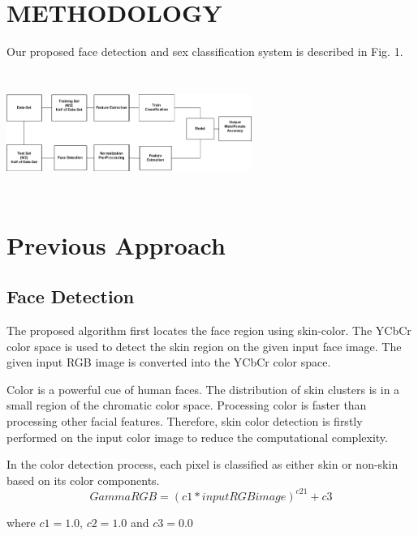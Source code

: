\documentclass[journal]{IEEEtran}
\begin{document}
	
	
	
	
	
	
	\ifCLASSOPTIONcaptionsoff
	\newpage
	\fi
	
	
	
	\section{\textbf{METHODOLOGY}}
	Our proposed face detection and sex classification system is
	described in Fig. 1.\\
	\begin{minipage}{\linewidth}
		\centering
		\includegraphics[width = 80mm,height=40mm]{Methodology.JPG}
	\end{minipage} 
	\section{\textbf{Previous Approach}}
	\subsection{\textbf{Face Detection}}
	The proposed algorithm first locates the face region
	using skin-color. The YCbCr color space is used to detect
	the skin region on the given input face image. The given
	input RGB image is converted into the YCbCr color
	space.
	
	
	Color is a powerful cue of human faces. The
	distribution of skin clusters is in a small region of the
	chromatic color space. Processing color is faster than
	processing other facial features. Therefore, skin color
	detection is firstly performed on the input color image to
	reduce the computational complexity.
	
	In the color detection process, each pixel is classified as
	either skin or non-skin based on its color components.
	\begin{equation}
	GammaRGB=(c1*inputRGBimage)^{c21} + c3
	\end{equation}
	
	where $c1=1.0$, $c2=1.0$ and $c3=0.0$\vspace{1mm}\\
	
\end{document}
